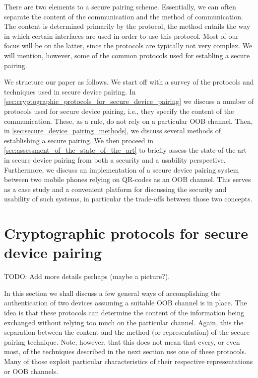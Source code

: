 \documentclass[conference, 12pt]{sty/IEEEtran}
\begin{document}
There are two elements to a secure pairing scheme.
Essentially, we can often separate the content of the communication and the method of communication.
The content is determined primarily by the protocol, the method entails the way in which certain interfaces are used in order to use this protocol.
Most of our focus will be on the latter, since the protocols are typically not very complex.
We will mention, however, some of the common protocols used for establing a secure pairing.

We structure our paper as follows.
We start off with a survey of the protocols and techniques used in secure device pairing.
In \autoref{sec:cryptographic_protocols_for_secure_device_pairing} we discuss a number of protocols used for secure device pairing, i.e., they specify the content of the communication.
These, as a rule, do not rely on a particular OOB channel.
Then, in \autoref{sec:secure_device_pairing_methods}, we discuss several methods of establishing a secure pairing.
We then proceed in \autoref{sec:assessment_of_the_state_of_the_art} to briefly assess the state-of-the-art in secure device pairing from both a security and a usability perspective.
Furthermore, we discuss an implementation of a secure device pairing system between two mobile phones relying on QR-codes as an OOB channel.
This serves as a case study and a convenient platform for discussing the security and usability of such systems, in particular the trade-offs between those two concepts.

\section{Cryptographic protocols for secure device pairing}
\label{sec:cryptographic_protocols_for_secure_device_pairing}

TODO: Add more details perhaps (maybe a picture?).

In this section we shall discuss a few general ways of accomplishing the authentication of two devices assuming a suitable OOB channel is in place.
The idea is that these protocols can determine the content of the information being exchanged without relying too much on the particular channel.
Again, this the separation between the content and the method (or representation) of the secure pairing technique.
Note, however, that this does not mean that every, or even most, of the techniques described in the next section use one of these protocols.
Many of those exploit particular characteristics of their respective representations or OOB channels.
\end{document}
